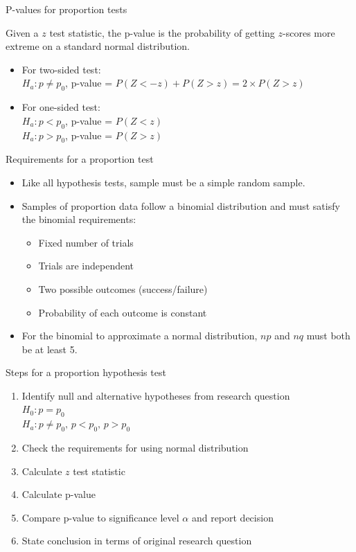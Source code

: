 \documentclass[xcolor=table, handout]{beamer}
\begin{document}
\begin{frame}{P-values for proportion tests}
\begin{block}{}
\large
Given a $z$ test statistic, the p-value is the probability of getting $z$-scores more extreme on a standard normal distribution.
\begin{itemize}
\pause\item For two-sided test:\\ 
$H_a: p \ne p_0$, p-value = $P(Z<-z) + P(Z > z) = 2 \times P(Z > z)$
\pause\item For one-sided test:\\
$H_a: p < p_0$, p-value = $P(Z < z)$\\
$H_a: p > p_0$, p-value = $P(Z > z)$
\end{itemize}
\end{block}
\end{frame}

\begin{frame}{Requirements for a proportion test}
\begin{block}{}
\large
\begin{itemize}
\item Like all hypothesis tests, sample must be a simple random sample.\\
\item Samples of proportion data follow a binomial distribution and must satisfy the binomial requirements:
\begin{itemize}
\item Fixed number of trials
\item Trials are independent
\item Two possible outcomes (success/failure)
\item Probability of each outcome is constant
\end{itemize}
\item For the binomial to approximate a normal distribution, $np$ and $nq$ must both be at least 5.
\end{itemize}
\end{block}
\end{frame}

\begin{frame}{Steps for a proportion hypothesis test}
\begin{block}{}
\large
\begin{enumerate}
\item Identify null and alternative hypotheses from research question\\
$H_0: p = p_0$\\
$H_a: p \ne p_0, \, p < p_0, \, p> p_0$
\item Check the requirements for using normal distribution
\item Calculate $z$ test statistic
\item Calculate p-value
\item Compare p-value to significance level $\alpha$ and report decision
\item State conclusion in terms of original research question
\end{enumerate}
\end{block}
\end{frame}
\end{document}
